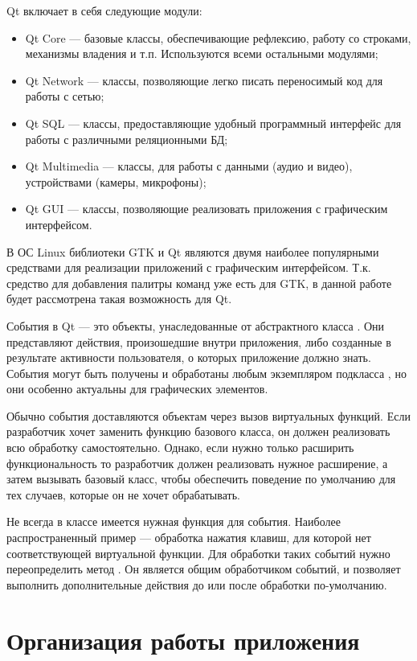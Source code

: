Qt включает в себя следующие модули:

\begin{itemize}
    \item Qt Core — базовые классы, обеспечивающие рефлексию, работу со
        строками, механизмы владения и т.п. Используются всеми остальными
        модулями;
    \item Qt Network — классы, позволяющие легко писать переносимый код для
        работы с сетью;
    \item Qt SQL — классы, предоставляющие удобный программный интерфейс для
        работы с различными реляционными БД;
    \item Qt Multimedia — классы, для работы с данными (аудио и видео),
        устройствами (камеры, микрофоны);
    \item Qt GUI — классы, позволяющие реализовать приложения с графическим
        интерфейсом.
\end{itemize}

В ОС Linux библиотеки GTK и Qt являются двумя наиболее популярными средствами
для реализации приложений с графическим интерфейсом. Т.к. средство для
добавления палитры команд уже есть для GTK, в данной работе будет рассмотрена
такая возможность для Qt.

События в Qt — это объекты, унаследованные от абстрактного класса .
Они представляют действия, произошедшие внутри приложения, либо созданные в
результате активности пользователя, о которых приложение должно знать. События
могут быть получены и обработаны любым экземпляром подкласса , но
они особенно актуальны для графических элементов.

Обычно события доставляются объектам через вызов виртуальных функций. Если
разработчик хочет заменить функцию базового класса, он должен реализовать
всю обработку самостоятельно. Однако, если нужно только расширить
функциональность то разработчик должен реализовать нужное расширение, а затем
вызывать базовый класс, чтобы обеспечить поведение по умолчанию для тех случаев,
которые он не хочет обрабатывать.

Не всегда в классе имеется нужная функция для события. Наиболее распространенный
пример — обработка нажатия клавиш, для которой нет соответствующей виртуальной
функции. Для обработки таких событий нужно переопределить метод
. Он является общим обработчиком событий, и позволяет
выполнить дополнительные действия до или после обработки по-умолчанию.

\section{Организация работы приложения}

